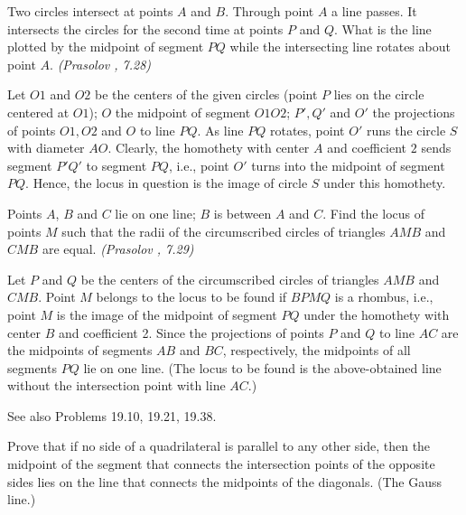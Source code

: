 \documentclass[11pt,twoside]{scrartcl}
\begin{document}
\begin{problem}
    Two circles intersect at points $A$ and $B$. Through point $A$ a line passes. It intersects the circles for the second time at points $P$ and $Q$. What is the line plotted by the midpoint of segment $PQ$ while the intersecting line rotates about point $A$. \textit{(Prasolov \cite{pgeo}, 7.28)}
    \begin{sketch}
    Let $O1$ and $O2$ be the centers of the given circles (point $P$ lies on the circle centered at $O1$); $O$ the midpoint of segment $O1O2$; $P', Q'$ and $O'$
    the projections of points $O1, O2$ and $O$ to line $P Q$. As line $P Q$ rotates, point $O'$ runs the circle $S$ with diameter $AO$. Clearly, the
    homothety with center $A$ and coefficient $2$ sends segment $P'Q'$
    to segment $P Q$, i.e., point $O'$ turns into the midpoint of segment $P Q$. Hence, the locus in question is the image of circle
    $S$ under this homothety.    
    \end{sketch}
\end{problem}

\begin{problem}
    Points $A$, $B$ and $C$ lie on one line; $B$ is between $A$ and $C$. Find the locus of points $M$ such that the radii of the circumscribed circles of triangles $AMB$ and $CMB$ are equal. \textit{(Prasolov \cite{pgeo}, 7.29)}
    \begin{sketch}
    Let $P$ and $Q$ be the centers of the circumscribed circles of triangles $AMB$ and
    $CMB$. Point $M$ belongs to the locus to be found if $BPMQ$ is a rhombus, i.e., point $M$ is the image of the midpoint of segment $P Q$ under the homothety with center $B$ and coefficient 2. Since the projections of points $P$ and $Q$ to line $AC$ are the midpoints of segments $AB$ and $BC$, respectively, the midpoints of all segments $PQ$ lie on one line. (The locus to be found is the above-obtained line without the intersection point with line $AC$.)    
    \end{sketch}
\end{problem}

\begin{remark}
    \TBD See also Problems 19.10, 19.21, 19.38.
\end{remark}



Prove that if no side of a quadrilateral is parallel to any other side, then the midpoint of the segment that connects the intersection points of the opposite sides lies on the line that connects the midpoints of the diagonals. (The Gauss line.)
\end{document}

